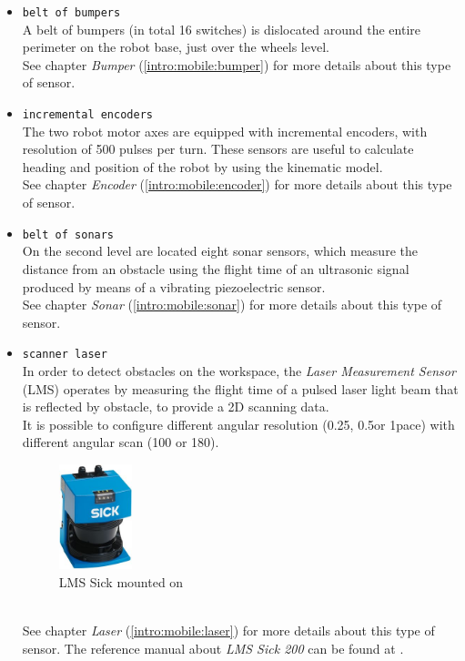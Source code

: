\begin{itemize}
\item \texttt{belt of bumpers} \\
  A belt of bumpers (in total 16 switches) is dislocated around
  the entire perimeter on the robot base, just over the wheels level. \\
  See chapter \textit{Bumper} (\ref{intro:mobile:bumper}) for more details
  about this type of sensor.

\item \texttt{incremental encoders} \\
  The two robot motor axes are equipped with incremental encoders, with
  resolution of 500 pulses per turn. These sensors are useful to calculate
  heading and position of the robot by using the kinematic model. \\  
  See chapter \textit{Encoder} (\ref{intro:mobile:encoder}) for more details
  about this type of sensor.
 
\item \texttt{belt of sonars} \\
  On the second level are located eight sonar sensors, which measure the
  distance from an obstacle using the flight time of an ultrasonic signal
  produced by means of a vibrating piezoelectric sensor. \\
  See chapter \textit{Sonar} (\ref{intro:mobile:sonar}) for more details
  about this type of sensor.

\item \texttt{scanner laser} \\
  In order to detect obstacles on the workspace, the \textit{Laser Measurement
  Sensor} (LMS) operates by measuring the flight time of a pulsed laser
  light beam that is reflected by obstacle, to provide a 2D scanning data. \\
  It is possible to configure different angular resolution (0.25\textdegree,
  0.5\textdegree or 1\textdegree pace) with different angular scan (100\textdegree
  or 180\textdegree).
  \begin{figure}[h]
    \begin{center}
      \includegraphics[width=60pt]{img/laser_sick_lms_200.jpg}
      \caption{LMS Sick mounted on \morduc{}}
      \label{fig:laser_sick_lms_200}
    \end{center}
  \end{figure}
  \\
  See chapter \textit{Laser} (\ref{intro:mobile:laser}) for more details
  about this type of sensor. The reference manual about \textit{LMS
  Sick 200} can be found at \cite{3morduc:laser_sick_200}.


\end{itemize}
